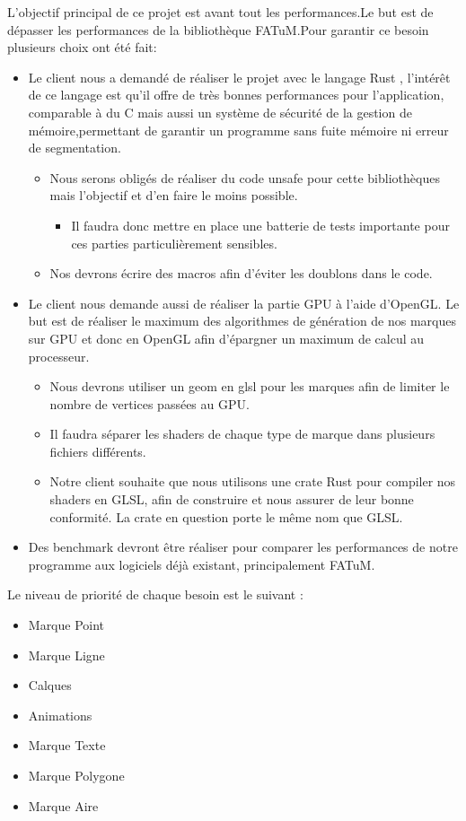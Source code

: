 \documentclass[12pt]{article}
\begin{document}
L'objectif principal de ce projet est avant tout les performances.Le but est de dépasser les performances de la bibliothèque FATuM.Pour garantir
ce besoin plusieurs choix ont été fait:
	\begin{itemize}
		\item Le client nous a demandé de réaliser le projet avec le langage Rust \cite{rust}, l'intérêt de ce langage est qu'il offre de très bonnes
		performances pour l'application, comparable à du C mais aussi un système de sécurité de la gestion de mémoire,permettant de garantir un programme
		sans fuite mémoire ni erreur de segmentation.
		\begin{itemize}
			\item Nous serons obligés de réaliser du code \gls{unsafe} pour cette bibliothèques mais l'objectif et d'en faire le moins possible.
			\begin{itemize}
				\item Il faudra donc mettre en place une batterie de tests importante pour ces parties particulièrement sensibles.
			\end{itemize}
			\item Nos devrons écrire des macros afin d'éviter les doublons dans le code.
		\end{itemize}
		\item Le client nous demande aussi de réaliser la partie GPU à l'aide d'OpenGL. Le but est de réaliser le maximum des algorithmes de génération de 		nos marques sur GPU et donc en OpenGL afin d'épargner un maximum de calcul au processeur.
		\begin{itemize}
			\item Nous devrons utiliser un \gls{geom} en glsl pour les marques afin de limiter le nombre de vertices passées au GPU.
			\item Il faudra séparer les \gls{shader}s de chaque type de marque dans plusieurs fichiers différents.
			\item Notre client souhaite que nous utilisons une crate Rust pour compiler
			nos shaders en GLSL, afin de construire et nous assurer de leur bonne conformité.
			La crate en question porte le même nom que GLSL\cite{GLSL}.
		\end{itemize}
		\item Des benchmark devront être réaliser pour comparer les performances de notre programme aux logiciels déjà existant, principalement FATuM.
	
	\end{itemize}
Le niveau de priorité de chaque besoin est le suivant :
\begin{itemize}
	\item Marque Point
	\item Marque Ligne
	\item Calques
	\item Animations
	\item Marque Texte
	\item Marque Polygone
	\item Marque Aire
\end{itemize}
\end{document}
